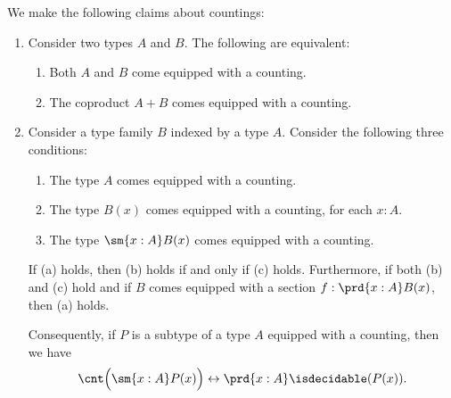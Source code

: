 \begin{thm}\label{thm:count}
  We make the following claims about countings:
  \begin{enumerate}
  \item\label{item:count-coprod} Consider two types $A$ and $B$. The following are equivalent:
    \begin{enumerate}
    \item Both $A$ and $B$ come equipped with a counting.
    \item The coproduct $A+B$ comes equipped with a counting.
    \end{enumerate}
  \item\label{item:count-Sigma} Consider a type family $B$ indexed by a type $A$. Consider the following three conditions:
    \begin{enumerate}
    \item \label{item:count-Sigma-count-base}The type $A$ comes equipped with a counting.
    \item \label{item:count-Sigma-count-fibers}The type $B(x)$ comes equipped with a counting, for each $x:A$.
    \item \label{item:count-Sigma-count-total}The type $\sm{x:A}B(x)$ comes equipped with a counting.
    \end{enumerate}
    If (a) holds, then (b) holds if and only if (c) holds. Furthermore, if both (b) and (c) hold and if $B$ comes equipped with a section $f:\prd{x:A}B(x)$, then (a) holds.

    Consequently, if $P$ is a subtype of a type $A$ equipped with a counting, then we have
    \begin{equation*}
      \cnt\Big(\sm{x:A}P(x)\Big)\leftrightarrow \prd{x:A}\isdecidable(P(x)).
    \end{equation*}
  \end{enumerate}
\end{thm}

